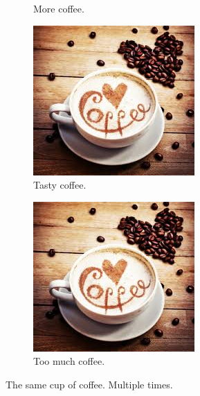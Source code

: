 \documentclass{article}
\begin{document}
\begin{figure}[h!]
\begin{subfigure}[b]{0.2\linewidth}
    		\caption{More coffee.}
  		\end{subfigure}
  		\begin{subfigure}[b]{0.2\linewidth}
    		\includegraphics[width=\linewidth]{coffee.jpg}
    		\caption{Tasty coffee.}
  		\end{subfigure}
  		\begin{subfigure}[b]{0.5\linewidth}
    		\includegraphics[width=\linewidth]{coffee.jpg}
    		\caption{Too much coffee.}
  		\end{subfigure}
  		\caption{The same cup of coffee. Multiple times.}
  		\label{fig:coffee3}
	\end{figure}
	
\end{document}
